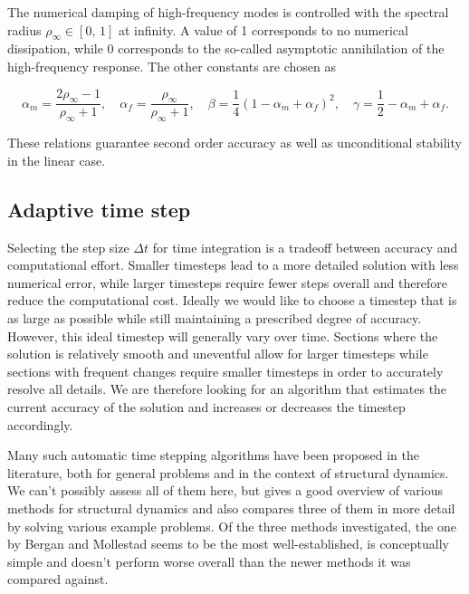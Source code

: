 The numerical damping of high-frequency modes is controlled with the spectral radius $\rho_{\infty} \in [0,\,1]$ at infinity.
A value of 1 corresponds to no numerical dissipation, while 0 corresponds to the so-called asymptotic annihilation of the high-frequency response.
The other constants are chosen as

\begin{equation}
\alpha_m = \frac{2\rho_{\infty} - 1}{\rho_{\infty} + 1},\quad \alpha_f = \frac{\rho_{\infty}}{\rho_{\infty} + 1},\quad \beta = \frac{1}{4}\left(1 - \alpha_m + \alpha_f\right)^2,\quad \gamma = \frac{1}{2} - \alpha_m + \alpha_f.
\end{equation}

These relations guarantee second order accuracy as well as unconditional stability in the linear case.

\subsection{Adaptive time step}

Selecting the step size $\Delta t$ for time integration is a tradeoff between accuracy and computational effort.
Smaller timesteps lead to a more detailed solution with less numerical error, while larger timesteps require fewer steps overall and therefore reduce the computational cost.
Ideally we would like to choose a timestep that is as large as possible while still maintaining a prescribed degree of accuracy.
However, this ideal timestep will generally vary over time.
Sections where the solution is relatively smooth and uneventful allow for larger timesteps while sections with frequent changes require smaller timesteps in order to accurately resolve all details.
We are therefore looking for an algorithm that estimates the current accuracy of the solution and increases or decreases the timestep accordingly.

Many such automatic time stepping algorithms have been proposed in the literature, both for general problems and in the context of structural dynamics.
We can't possibly assess all of them here, but \cite{bib:rossi2014} gives a good overview of various methods for structural dynamics and also compares three of them in more detail by solving various example problems.
Of the three methods investigated, the one by Bergan and Mollestad \cite{bib:bergan1985} seems to be the most well-established, is conceptually simple and doesn't perform worse overall than the newer methods it was compared against.


